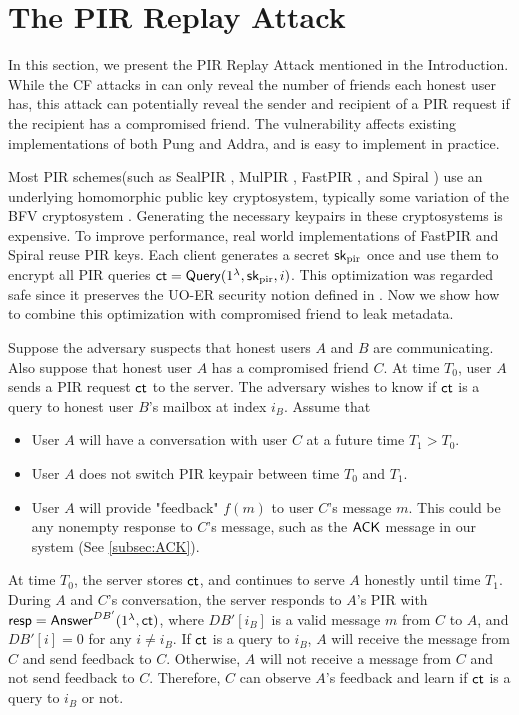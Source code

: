 \section{The PIR Replay Attack}
\label{sec:security-vulnerable}

In this section, we present the PIR Replay Attack mentioned in the Introduction. While the CF attacks in \cite{angel2018cf} can only reveal the number of friends each honest user has, this attack can potentially reveal the sender and recipient of a PIR request if the recipient has a compromised friend. The vulnerability affects existing implementations of both Pung and Addra, and is easy to implement in practice.

Most PIR schemes(such as SealPIR \cite{angel2018pir}, MulPIR \cite{ali2021communicationcomputation}, FastPIR \cite{ahmad2021addra}, and Spiral \cite{wu2022spiral}) use an underlying homomorphic public key cryptosystem, typically some variation of the BFV cryptosystem \cite{fan2012somewhat}. Generating the necessary keypairs in these cryptosystems is expensive. To improve performance, real world implementations of FastPIR and Spiral reuse PIR keys. Each client generates a secret ${\mathsf{sk}}_{\text{pir}}$ once and use them to encrypt all PIR queries $\mathsf{ct} = \mathsf{Query}(1^{\lambda}, {\mathsf{sk}}_{\text{pir}}, i)$. This optimization was regarded safe since it preserves the UO-ER security notion defined in \cite[Extended Version]{angel2016unobservable}. Now we show how to combine this optimization with compromised friend to leak metadata.

Suppose the adversary suspects that honest users $A$ and $B$ are communicating. Also suppose that honest user $A$ has a compromised friend $C$. At time $T_0$, user $A$ sends a PIR request $\mathsf{ct}$ to the server. The adversary wishes to know if $\mathsf{ct}$ is a query to honest user $B$'s mailbox at index $i_B$. Assume that
\begin{itemize}
    \item User $A$ will have a conversation with user $C$ at a future time $T_1 > T_0$. 
    \item User $A$ does not switch PIR keypair between time $T_0$ and $T_1$.
    \item User $A$ will provide "feedback" $f(m)$ to user $C$'s message $m$. This could be any nonempty response to $C$'s message, such as the $\mathsf{ACK}$ message in our system (See \cref{subsec:ACK}).
\end{itemize}

At time $T_0$, the server stores $\mathsf{ct}$, and continues to serve $A$ honestly until time $T_1$. During $A$ and $C$'s conversation, the server responds to $A$'s PIR with $\mathsf{resp} = \mathsf{Answer}^{DB'}(1^{\lambda}, \mathsf{ct})$, where $DB'[i_B]$ is a valid message $m$ from $C$ to $A$, and $DB'[i] = 0$ for any $i \neq i_B$. If $\mathsf{ct}$ is a query to $i_B$, $A$ will receive the message from $C$ and send feedback to $C$. Otherwise, $A$ will not receive a message from $C$ and not send feedback to $C$. Therefore, $C$ can observe $A$'s feedback and learn if $\mathsf{ct}$ is a query to $i_B$ or not.


